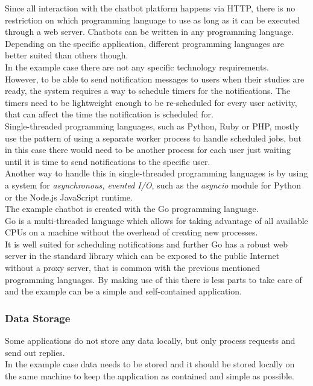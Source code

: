 Since all interaction with the chatbot platform happens via HTTP,
there is no restriction on which programming language to use as long as it can be executed through a web server.
Chatbots can be written in any programming language.
\\
Depending on the specific application, different programming languages are better suited than others though.
\\

In the example case there are not any specific technology requirements.
\\
However, to be able to send notification messages to users when their studies are ready,
the system requires a way to schedule timers for the notifications.
The timers need to be lightweight enough to be re-scheduled for every user activity,
that can affect the time the notification is scheduled for.
\\
Single-threaded programming languages, such as Python, Ruby or PHP,
mostly use the pattern of using a separate worker process to handle scheduled jobs,
but in this case there would need to be another process for each user
just waiting until it is time to send notifications to the specific user.
\\
Another way to handle this in single-threaded programming languages is by using a system for \emph{asynchronous, evented I/O},
such as the \emph{asyncio} module for Python\cite{asyncio} or the Node.js JavaScript runtime\cite{nodejs}.
\\

The example chatbot is created with the Go programming language\cite{golang}.
\\
Go is a multi-threaded language which allows for taking advantage of all available CPUs
on a machine without the overhead of creating new processes.
\\
It is well suited for scheduling notifications and further Go has a robust web server in the standard library which can be exposed to the public Internet without a proxy server, that is common with the previous mentioned programming languages.
By making use of this there is less parts to take care of and the example can be a simple and self-contained application.
\\


\subsubsection{Data Storage}

Some applications do not store any data locally, but only process requests and send out replies.
\\
In the example case data needs to be stored and it should be stored locally on the same machine
to keep the application as contained and simple as possible.
\\

